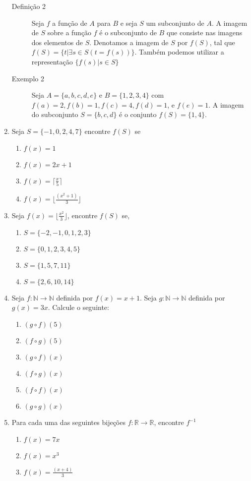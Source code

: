 \begin{enumerate}
	\begin{description}
		\item[Definição 2] Seja $f$ a função de $A$ para $B$ e seja $S$ um subconjunto de $A$. A imagem de $S$ sobre a função $f$ é o
		subconjunto de $B$ que consiste nas imagens dos elementos de $S$. Denotamos a imagem de $S$ por $f(S)$, tal que
		$f(S) = \{t | \exists s \in S(t = f(s))\}$. Também podemos utilizar a representação $\{f(s) | s \in S\}$
		\item[Exemplo 2] Seja $A = \{a,b,c,d,e\}$ e $B = \{1,2,3,4\}$ com $f(a)=2, f(b)=1, f(c)=4, f(d)=1$, e $f(e)=1$. A imagem
		do subconjunto $S = \{b,c,d\}$ é o conjunto $f(S) = \{1, 4\}$.
	\end{description}

	\item Seja $S = \{-1,0,2,4,7\}$ encontre $f(S)$ se
	\begin{enumerate}
	  	\item $f(x)=1$ \item $f(x)=2x + 1$ \item $f(x)=\lceil \frac{x}{5} \rceil$ \item $f(x) = \lfloor \frac{(x^2 + 1)}{3} \rfloor$  
	\end{enumerate}

	\item Seja $f(x) = \lfloor \frac{x^2}{3} \rfloor$, encontre $f(S)$ se,
	\begin{enumerate}
		\item $S = \{-2,-1,0,1,2,3\}$ \item $S=\{0,1,2,3,4,5\}$ \item $S=\{1,5,7,11\}$ \item $S=\{2,6,10,14\}$ 
	\end{enumerate}
	
	\item Seja $f: \mathbb{N} \to \mathbb{N}$ definida por $f(x) = x + 1$. Seja $g: \mathbb{N} \to \mathbb{N}$ definida por $g(x) = 3x$.
	Calcule o seguinte:
	\begin{enumerate}
	  	\item $(g \circ f)(5)$ \item $(f \circ g)(5)$ \item $(g \circ f)(x)$ \item $(f \circ g)(x)$ \item $(f \circ f)(x)$
	  	\item $(g \circ g)(x)$
	\end{enumerate}
	
	\item Para cada uma das seguintes bijeções $f: \mathbb{R} \to \mathbb{R}$, encontre $f^{-1}$
	\begin{enumerate}
	  	\item $f(x)=7x$ \item $f(x) = x^3$ \item $f(x) = \frac{(x + 4)}{3}$
	\end{enumerate}
\end{enumerate}



\vspace*{2em}
